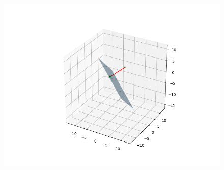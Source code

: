 \documentclass{beamer}
\theoremstyle{remark}
\numberwithin{equation}{section}
\begin{document}
\begin{frame}
\begin{figure}[H]
\centering
\includegraphics[width=0.8\columnwidth]{figs/img.png}
\caption*{}
\end{figure}
\end{frame}
\end{document}
